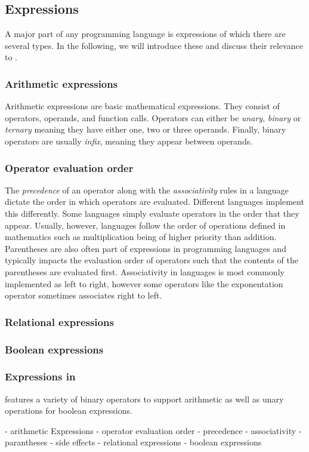 \subsection{Expressions}
A major part of any programming language is expressions of which there are several types.
In the following, we will introduce these and discuss their relevance to \dazel{}.

\subsubsection*{Arithmetic expressions}
Arithmetic expressions are basic mathematical expressions.
They consist of operators, operands, and function calls. 
Operators can either be \textit{unary}, \textit{binary} or \textit{ternary} meaning they have either one, two or three operands.
Finally, binary operators are usually \textit{infix}, meaning they appear between operands.

\subsubsection*{Operator evaluation order}
The \textit{precedence} of an operator along with the \textit{associativity} rules in a language dictate the order in which operators are evaluated.
Different languages implement this differently. Some languages simply evaluate operators in the order that they appear. Usually, however, languages follow the order of operations defined in mathematics such as multiplication being of higher priority than addition.
Parentheses are also often part of expressions in programming languages and typically impacts the evaluation order of operators such that the contents of the parentheses are evaluated first.
Associativity in languages is most commonly implemented as left to right, however some operators like the exponentation operator sometimes associates right to left. 

\subsubsection*{Relational expressions}


\subsubsection*{Boolean expressions}

\subsubsection*{Expressions in \dazel{}}
\dazel{} features a variety of binary operators to support arithmetic as well as unary operations for boolean expressions.

- arithmetic Expressions
- operator evaluation order
	- precedence
	- associativity
	- parantheses
	- side effects
- relational expressions
- boolean expressions

